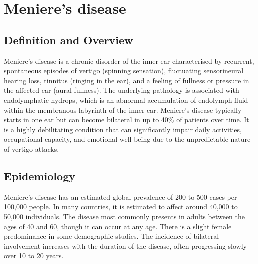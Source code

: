 \chapter{Meniere's disease}

\section*{Definition and Overview}
Meniere's disease is a chronic disorder of the inner ear characterised by recurrent, spontaneous episodes of vertigo (spinning sensation), fluctuating sensorineural hearing loss, tinnitus (ringing in the ear), and a feeling of fullness or pressure in the affected ear (aural fullness). The underlying pathology is associated with endolymphatic hydrops, which is an abnormal accumulation of endolymph fluid within the membranous labyrinth of the inner ear. Meniere's disease typically starts in one ear but can become bilateral in up to 40\% of patients over time. It is a highly debilitating condition that can significantly impair daily activities, occupational capacity, and emotional well-being due to the unpredictable nature of vertigo attacks.

\section*{Epidemiology}
Meniere's disease has an estimated global prevalence of 200 to 500 cases per 100,000 people. In many countries, it is estimated to affect around 40,000 to 50,000 individuals. The disease most commonly presents in adults between the ages of 40 and 60, though it can occur at any age. There is a slight female predominance in some demographic studies. The incidence of bilateral involvement increases with the duration of the disease, often progressing slowly over 10 to 20 years.

